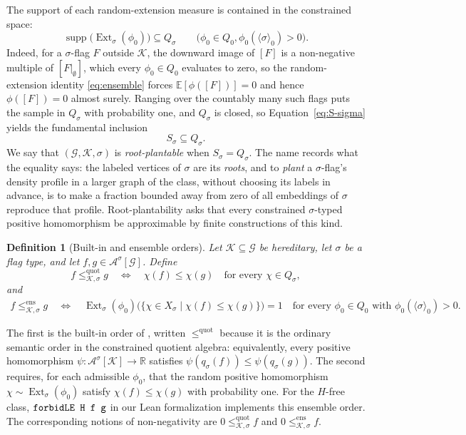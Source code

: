 \documentclass[acmsmall,screen=true,acmthm=false]{acmart}
\newtheorem{definition}[definition]{Definition}
\newcommand{\R}{\mathbb{R}}
\newcommand{\FlagAlg}[1]{\mathcal{A}^{#1}}
\DeclareRobustCommand{\lean}[1]{{\def\_{\textunderscore\allowbreak}\texttt{#1}}}
\newcommand{\Ext}{\operatorname{Ext}}
\begin{document}
The support of each random-extension measure is contained in the constrained
space:
\[
  \operatorname{supp}\bigl(\Ext_\sigma(\phi_0)\bigr)
  \subseteq Q_\sigma
  \qquad
  \bigl(\phi_0\in Q_0,
        \phi_0(\langle\sigma\rangle_0)>0\bigr).
\]
Indeed, for a \(\sigma\)-flag \(F\) outside \(\mathcal K\), the downward image
of \([F]\) is a non-negative multiple of \([F|_\emptyset]\), which every
\(\phi_0\in Q_0\) evaluates to zero, so the random-extension identity
\eqref{eq:ensemble} forces \(\mathbb{E}[\phi([F])]=0\) and hence
\(\phi([F])=0\) almost surely.  Ranging over the countably many such flags
puts the sample in \(Q_\sigma\) with probability one, and \(Q_\sigma\) is
closed, so Equation~\eqref{eq:S-sigma} yields the
fundamental inclusion
\begin{equation}\label{eq:S-subset-Q}
  S_\sigma\subseteq Q_\sigma.
\end{equation}
We say that \((\mathcal G,\mathcal K,\sigma)\) is \emph{root-plantable} when
\(S_\sigma=Q_\sigma\).  The name records what the equality says: the labeled
vertices of \(\sigma\) are its \emph{roots}, and to \emph{plant} a
\(\sigma\)-flag's density profile in a larger graph of the class, without
choosing its labels in advance, is to make a fraction bounded away from zero
of all embeddings of \(\sigma\) reproduce that profile.  Root-plantability
asks that every constrained \(\sigma\)-typed positive homomorphism be
approximable by finite constructions of this kind.

\begin{definition}[Built-in and ensemble orders]\label{def:two-constrained-orders}
Let \(\mathcal K\subseteq\mathcal G\) be hereditary, let \(\sigma\) be a flag
type, and let \(f,g\in\FlagAlg{\sigma}[\mathcal G]\).  Define
\[
  f\leq^{\mathrm{quot}}_{\mathcal K,\sigma}g
  \quad\Longleftrightarrow\quad
  \chi(f)\leq\chi(g)
  \quad\text{for every }\chi\in Q_\sigma,
\]
and
\[
\begin{aligned}
  f\leq^{\mathrm{ens}}_{\mathcal K,\sigma}g
  \quad\Longleftrightarrow\quad
  \Ext_\sigma(\phi_0)
  \bigl(\{\chi\in X_\sigma\mid \chi(f)\leq\chi(g)\}\bigr)=1
  \quad\text{for every }\phi_0\in Q_0\text{ with }
  \phi_0(\langle\sigma\rangle_0)>0.
\end{aligned}
\]
\end{definition}

The first is the built-in order of , written
\(\leq^{\mathrm{quot}}\) because it is the ordinary semantic order in the
constrained quotient algebra: equivalently, every positive homomorphism
\(\psi:\FlagAlg{\sigma}[\mathcal K]\to\R\) satisfies
\(\psi(q_\sigma(f))\leq\psi(q_\sigma(g))\).  The second requires, for each
admissible \(\phi_0\), that the random positive homomorphism
\(\chi\sim\Ext_\sigma(\phi_0)\) satisfy \(\chi(f)\leq\chi(g)\) with
probability one.
For the \(H\)-free class,
\(\lean{forbidLE H f g}\) in our Lean formalization implements this ensemble order.  The corresponding
notions of non-negativity are \(0\leq^{\mathrm{quot}}_{\mathcal K,\sigma}f\) and
\(0\leq^{\mathrm{ens}}_{\mathcal K,\sigma}f\).
\end{document}
